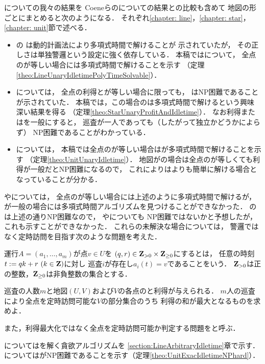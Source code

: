 {\patProb}についての我々の結果を
Coeneらの{\independentPatProb}についての結果との比較も含めて
地図の形ごとにまとめると次のようになる．
それぞれ\ref{chapter: line}，\ref{chapter: star}，\ref{chapter: unit}節で述べる．
\begin{itemize}
\item 
  {\graphLine}の
  {\independentPatProb}は動的計画法により多項式時間で解けることが
  示されていた\cite[Theorem~11]{coene2011charlemagne}が，
  その正しさは単独警邏という設定に強く依存している．
  本稿では{\patProb}について，
  全点の{\maxIdletime}が等しい場合には多項式時間で解けることを示す
  （定理\ref{theo:LineUnaryIdletimePolyTimeSolvable}）．
\item
  {\graphStar}については，
  全点の利得と{\maxIdletime}が等しい場合に限っても，
  {\independentPatProb}はNP困難であることが示されていた\cite[Theorem~10]{coene2011charlemagne}．
  本稿では，この場合の{\patProb}は多項式時間で解けるという興味深い結果を得る
  （定理\ref{theo:StarUnaryProfitAndIdletime}）．
  なお利得または{\maxIdletime}を一般にすると，
  巡査が一人であっても（したがって独立かどうかによらず）
  NP困難であることがわかっている\cite[Theorems 5 and 6]{coene2011charlemagne}．
\item 
  {\graphUnit}については，
  本稿では全点の{\maxIdletime}が等しい場合は{\patProb}が多項式時間で解けることを示す
  （定理\ref{theo:UnitUnaryIdletime}）．
  地図が{\graphStar}の場合は全点の{\maxIdletime}が等しくても利得が一般だとNP困難になるので，
  これにより{\graphUnit}は{\graphStar}よりも簡単に解ける場合となっていることが分かる．
\end{itemize}

{\graphLine}や{\graphUnit}については，
全点の{\maxIdletime}が等しい場合には上述のように多項式時間で解けるが，
{\maxIdletime}が一般の場合には多項式時間アルゴリズムを見つけることができなかった．
{\graphStar}の{\patProb}は上述の通りNP困難なので\cite[Theorems 5 and 6]{coene2011charlemagne}，
{\graphLine}や{\graphUnit}についても
NP困難ではないかと予想したが，これも示すことができなかった．
これらの未解決な場合については，
警邏ではなく定時訪問を目指す次のような問題を考えた．

運行$A = (a _1, \ldots, a _m)$が点$v \in U$を
{\exactTime}$(q, r) \in \mathbf Z_{>0} \times \mathbf Z_{\geq 0}$にするとは，
任意の時刻$t := q k + r\ (k \in \mathbf Z)$に対し
巡査$i$が存在し$a _i (t) = v$であることをいう．
$\mathbf Z_{>0}$は正の整数，$\mathbf Z_{\geq 0}$は非負整数の集合とする．

\begin{timeSpecifiedPatrollingProblem}
  巡査の人数$m$と地図$(U, V)$および$V$の各点の{\exactTime}と利得が与えられる．
  $m$人の巡査により全点を定時訪問可能な$V$の部分集合のうち
  利得の和が最大となるものを求めよ．
\end{timeSpecifiedPatrollingProblem}

また，利得最大化ではなく全点を定時訪問可能か判定する問題を{\timeSpecifiedPatProbDecision}と呼ぶ．


{\graphLine}については{\timeSpecifiedPatProbDecision}を解く貪欲アルゴリズムを
\ref{section:LineArbitraryIdletime}章で示す．
{\graphUnit}については{\timeSpecifiedPatProb}がNP困難であることを示す（定理\ref{theo:UnitExacIdletimeNPhard}）．
